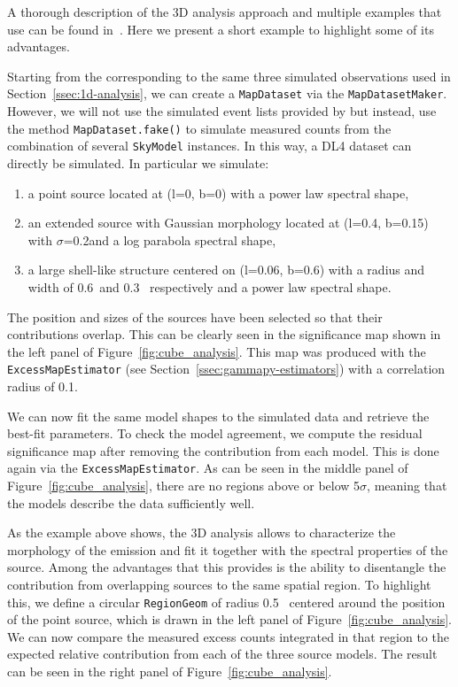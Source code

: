 \documentclass[traditabstract, longauth]{aa}
\newcommand{\code}[1]{\texttt{#1}}
\begin{document}
A thorough description of the 3D analysis approach and multiple examples that
use \gammapy can be found in~\cite{Mohrmann2019}. Here we present a short
example to highlight some of its advantages.

Starting from the \irfs corresponding to the same three simulated \cta
observations used in Section~\ref{ssec:1d-analysis}, we can create a \code{MapDataset}
via the \code{MapDatasetMaker}. However, we will not use the simulated event lists
provided by \cta but instead, use the method \code{MapDataset.fake()} to simulate
measured counts from the combination of several \code{SkyModel} instances. In this
way, a DL4 dataset can directly be simulated. In particular we simulate:
\begin{enumerate}
    \item a point source located at (l=0\textdegree, b=0\textdegree) with a power law
	      spectral shape,
    \item an extended source with Gaussian morphology located at (l=0.4\textdegree,
	      b=0.15\textdegree) with $\sigma$=0.2\textdegree and a log parabola spectral
	      shape,
    \item a large shell-like structure centered on (l=0.06\textdegree,
	      b=0.6\textdegree) with a radius and width of 0.6\textdegree~and 0.3\textdegree~
	      respectively and a power law spectral shape.
\end{enumerate}

The position and sizes of the sources
have been selected so that their contributions overlap. This can be clearly
seen in the significance map shown in the left panel of
Figure~\ref{fig:cube_analysis}. This map was produced with the
\code{ExcessMapEstimator} (see Section~\ref{ssec:gammapy-estimators}) with a
correlation radius of 0.1\textdegree.

We can now fit the same model shapes to the simulated data and retrieve the
best-fit parameters. To check the model agreement, we compute the residual
significance map after removing the contribution from each model. This is done
again via the \code{ExcessMapEstimator}. As can be seen in the middle panel of
Figure~\ref{fig:cube_analysis}, there are no regions above or below 5$\sigma$,
meaning that the models describe the data sufficiently well.

As the example above shows, the 3D analysis allows to characterize the
morphology of the emission and fit it together with the spectral properties of
the source.  Among the advantages that this provides is the ability to
disentangle the contribution from overlapping sources to the same spatial
region. To highlight this, we define a circular \code{RegionGeom} of radius
0.5\textdegree~ centered around the position of the point source, which is drawn
in the left panel of Figure~\ref{fig:cube_analysis}. We can now compare the
measured excess counts integrated in that region to the expected relative
contribution from each of the three source models. The result can be seen in the right
panel of Figure~\ref{fig:cube_analysis}.
\end{document}
